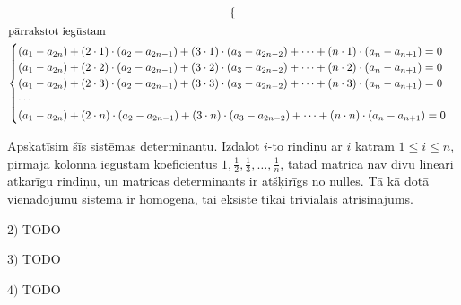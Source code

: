\documentclass{ludis}
\begin{document}
\begin{pieradijums}
\begin{gather*}
\begin{cases}
	\end{cases}\\
\intertext{pārrakstot iegūstam}
	\begin{cases}
		(a_1 - a_{2n}) + (2\cdot 1) \cdot (a_2 - a_{2n-1}) + (3 \cdot 1)\cdot (a_3 - a_{2n-2}) + \cdots + (n \cdot 1) \cdot (a_n - a_{n+1}) = 0\\
		(a_1 - a_{2n}) + (2\cdot 2) \cdot (a_2 - a_{2n-1}) + (3 \cdot 2)\cdot (a_3 - a_{2n-2}) + \cdots + (n \cdot 2) \cdot (a_n - a_{n+1}) = 0\\
		(a_1 - a_{2n}) + (2\cdot 3) \cdot (a_2 - a_{2n-1}) + (3 \cdot 3)\cdot (a_3 - a_{2n-2}) + \cdots + (n \cdot 3) \cdot (a_n - a_{n+1}) = 0\\
		\cdots \\
		(a_1 - a_{2n}) + (2\cdot n) \cdot (a_2 - a_{2n-1}) + (3 \cdot n)\cdot (a_3 - a_{2n-2}) + \cdots + (n \cdot n) \cdot (a_n - a_{n+1}) = 0\\
	\end{cases}
\end{gather*}

Apskatīsim šīs sistēmas determinantu. Izdalot $i$-to rindiņu ar $i$ katram $1 \leq i \leq n$, pirmajā kolonnā iegūstam koeficientus
$1, \frac{1}{2}, \frac{1}{3}, \ldots, \frac{1}{n}$,
tātad matricā nav divu lineāri atkarīgu rindiņu, un matricas determinants ir atšķirīgs no nulles. Tā kā dotā vienādojumu sistēma ir homogēna, tai eksistē tikai triviālais atrisinājums.

$2)$ TODO

$3)$ TODO

$4)$ TODO
\end{pieradijums}
\end{document}
